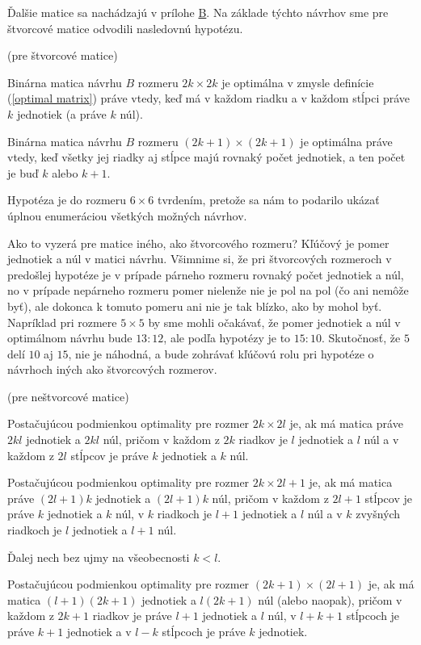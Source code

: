 Ďalšie matice sa nachádzajú v prílohe \hyperref[appendix:b]{B}. Na základe týchto návrhov sme pre štvorcové matice odvodili nasledovnú hypotézu.

\begin{hypoteza}
\label{hypoteza1}
(pre štvorcové matice)

Binárna matica návrhu $B$ rozmeru $2k \times 2k$ je optimálna v zmysle definície (\ref{optimal matrix}) práve vtedy, 
keď má v každom riadku a v každom stĺpci práve $k$ jednotiek (a práve $k$ núl).

Binárna matica návrhu $B$ rozmeru $(2k + 1) \times (2k + 1)$ je optimálna práve vtedy, 
keď všetky jej riadky aj stĺpce majú rovnaký počet jednotiek, a ten počet je buď $k$ alebo $k + 1$.
\end{hypoteza}

\begin{com}
Hypotéza je do rozmeru $6 \times 6$ tvrdením, pretože sa nám to podarilo ukázať úplnou enumeráciou všetkých možných návrhov.
\end{com}

Ako to vyzerá pre matice iného, ako štvorcového rozmeru? 
Kľúčový je pomer jednotiek a núl v matici návrhu. 
Všimnime si, že pri štvorcových rozmeroch v predošlej hypotéze je v prípade párneho rozmeru rovnaký počet jednotiek a núl, 
no v prípade nepárneho rozmeru pomer nielenže nie je pol na pol (čo ani nemôže byť), 
ale dokonca k tomuto pomeru ani nie je tak blízko, ako by mohol byť. 
Napríklad pri rozmere $5 \times 5$ by sme mohli očakávať, že pomer jednotiek a núl v optimálnom návrhu bude $13:12$, 
ale podľa hypotézy je to $15:10$. Skutočnosť, že $5$ delí $10$ aj $15$, nie je náhodná, 
a bude zohrávať kľúčovú rolu pri hypotéze o návrhoch iných ako štvorcových rozmerov.

\begin{hypoteza}
\label{hypoteza2}
(pre neštvorcové matice)

Postačujúcou podmienkou optimality pre rozmer $2k \times 2l$ je, ak má matica práve $2kl$ jednotiek a $2kl$ núl, 
pričom v každom z $2k$ riadkov je $l$ jednotiek a $l$ núl a v každom z $2l$ stĺpcov je práve $k$ jednotiek a $k$ núl.

Postačujúcou podmienkou optimality pre rozmer $2k \times 2l + 1$ je, ak má matica práve $(2l + 1)k$ jednotiek a $(2l + 1)k$ núl, 
pričom v každom z $2l + 1$ stĺpcov je práve $k$ jednotiek a $k$ núl, v $k$ riadkoch je $l + 1$ jednotiek a $l$ núl 
a v $k$ zvyšných riadkoch je $l$ jednotiek a $l + 1$ núl.

Ďalej nech bez ujmy na všeobecnosti $k < l$.

Postačujúcou podmienkou optimality pre rozmer $(2k + 1) \times (2l + 1)$ je, 
ak má matica $(l + 1)(2k + 1)$ jednotiek a $l(2k + 1)$ núl (alebo naopak), 
pričom v každom z $2k + 1$ riadkov je práve $l + 1$ jednotiek a $l$ núl, v $l + k + 1$ stĺpcoch je práve $k + 1$
jednotiek a v $l - k$ stĺpcoch je práve $k$ jednotiek.
\end{hypoteza}


